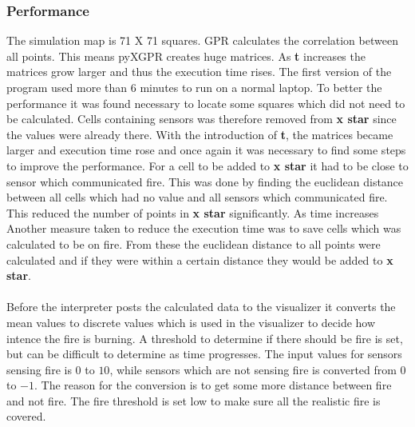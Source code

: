 \subsubsection{Performance}
The simulation map is 71 X 71 squares. GPR calculates the correlation between all points. This means pyXGPR creates huge matrices. As \textbf{t} increases the matrices grow larger and thus the execution time rises. The first version of the program used more than 6 minutes to run on a normal laptop. To better the performance it was found necessary to locate some squares which did not need to be calculated. Cells containing sensors was therefore removed from \textbf{x star} since the values were already there. With the introduction of \textbf{t}, the matrices became larger and execution time rose and once again it was necessary to find some steps to improve the performance. For a cell to be added to \textbf{x star} it had to be close to sensor which communicated fire. This was done by finding the euclidean distance between all cells which had no value and all sensors which communicated fire. This reduced the number of points in \textbf{x star} significantly. As time increases Another measure taken to reduce the execution time was to save cells which was calculated to be on fire. From these the euclidean distance to all points were calculated and if they were within a certain distance they would be added to \textbf{x star}.
\\\\
Before the interpreter posts the calculated data to the visualizer it converts the mean values to discrete values which is used in the visualizer to decide how intence the fire is burning. A threshold to determine if there should be fire is set, but can be difficult to determine as time progresses. The input values for sensors sensing fire is $0 $ to $10$, while sensors which are not sensing fire is converted from $ 0 $ to $ -1 $. The reason for the conversion is to get some more distance between fire and not fire. The fire threshold is set low to make sure all the realistic fire is covered.
\\\\
